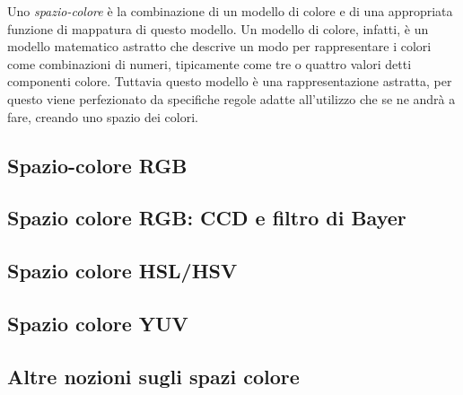 \documentclass{subfiles}
\begin{document}
Uno \emph{spazio-colore} è la combinazione di un modello di colore e di una appropriata funzione di mappatura di questo modello.
Un modello di colore, infatti, è un modello matematico astratto che descrive un modo per rappresentare i colori come combinazioni di numeri,
tipicamente come tre o quattro valori detti componenti colore.
Tuttavia questo modello è una rappresentazione astratta, per questo viene perfezionato da specifiche regole adatte all'utilizzo che se ne andrà a fare,
creando uno spazio dei colori.

\subsection{Spazio-colore RGB}


\subsection{Spazio colore RGB: CCD e filtro di Bayer}


\subsection{Spazio colore HSL/HSV}


\subsection{Spazio colore YUV}


\subsection{Altre nozioni sugli spazi colore}

\clearpage
\end{document}
